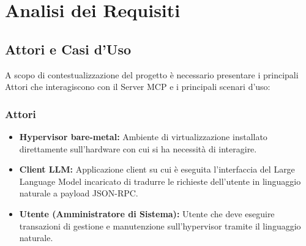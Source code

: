\chapter{Analisi dei Requisiti}
\section{Attori e Casi d'Uso}
A scopo di contestualizzazione del progetto è necessario presentare i principali Attori che interagiscono con il Server MCP e i principali scenari d'uso:

\subsection{Attori}
\begin{itemize}
    \item \textbf{Hypervisor bare-metal:} Ambiente di virtualizzazione installato direttamente sull'hardware con cui si ha necessità di interagire.
    
    \item \textbf{Client LLM:} Applicazione client su cui è eseguita l'interfaccia del Large Language Model incaricato di tradurre le richieste dell'utente in linguaggio naturale a payload JSON-RPC.
    
    \item \textbf{Utente (Amministratore di Sistema):} Utente che deve eseguire transazioni di gestione e manutenzione sull'hypervisor tramite il linguaggio naturale.
\end{itemize}


